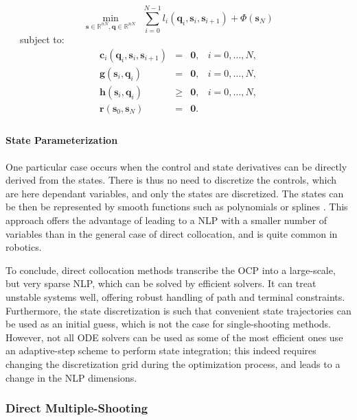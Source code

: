 \begin{equation}
  \min_{\mathbf{s}\in\mathbb R^{nN},\mathbf{q}\in\mathbb R^{nN}} \ \ \sum_{i=0}^{N-1}l_i(\mathbf{q}_i,\mathbf{s}_i,\mathbf{s}_{i+1}) + \Phi(\mathbf{s}_N)
\end{equation}
\ \ \ subject to:
\begin{equation}
  \begin{array}{rclr}
    \mathbf{c}_i(\mathbf{q}_i,\mathbf{s}_i,\mathbf{s}_{i+1}) & = & \mathbf{0}, & i=0,\ldots,N,%
    \\
    \mathbf{g}(\mathbf{s}_i,\mathbf{q}_i) & = & \mathbf{0}, & i=0,\ldots,N,%
    \\%
    \mathbf{h}(\mathbf{s}_i,\mathbf{q}_i) & \ge & \mathbf{0}, & i=0,\ldots,N,%
    \\%
    \mathbf{r} (\mathbf{s}_0, \mathbf{s}_N) & = & \mathbf{0}.%
    \\%
  \end{array}
\end{equation} 

\paragraph{State Parameterization}
One particular case occurs when the control and state derivatives can
be directly derived from the states. There is thus no need to
discretize the controls, which are here dependant variables, and only
the states are discretized. The states can be then be represented by
smooth functions such as polynomials or splines
\cite{sirinesa1981}. This approach offers the advantage of leading to
a NLP with a smaller number of variables than in the general case of
direct collocation, and is quite common in robotics.

To conclude, direct collocation methods transcribe the OCP into a
large-scale, but very sparse NLP, which can be solved by efficient
solvers. It can treat unstable systems well, offering robust handling
of path and terminal constraints. Furthermore, the state
discretization is such that convenient state trajectories can be used
as an initial guess, which is not the case for single-shooting
methods. However, not all ODE solvers can be used as some of the most
efficient ones use an adaptive-step scheme to perform state
integration; this indeed requires changing the discretization grid
during the optimization process, and leads to a change in the NLP
dimensions.

\subsubsection{Direct Multiple-Shooting}
\label{subsubsec:chap3-direct-multiple-shooting}

